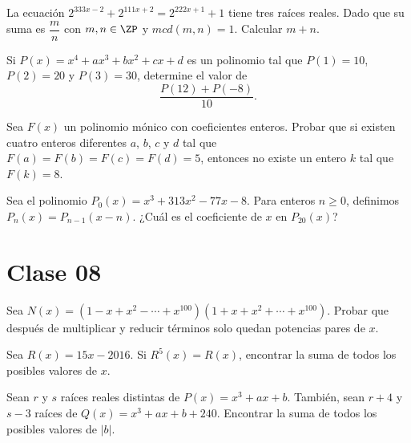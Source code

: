     \begin{section-problem}
        La ecuación $2^{333x - 2} + 2^{111x + 2} = 2^{222x + 1} + 1$ tiene tres raíces reales.
        Dado que su suma es $\dfrac{m}{n}$ con $m, n \in \ZP$ y $mcd(m, n) = 1$.
        Calcular $m + n$.
    \end{section-problem}

    \begin{section-problem}
        Si $P(x) = x^4 + ax^3 + bx^2 + cx + d$ es un polinomio tal que $P(1) = 10$, $P(2) = 20$ y $P(3) = 30$, determine el valor de
        \[\frac{P(12) + P(-8)}{10}.\]
    \end{section-problem}

    \begin{section-problem}
        Sea $F(x)$ un polinomio mónico con coeficientes enteros.
        Probar que si existen cuatro enteros diferentes $a$, $b$, $c$ y $d$ tal que $F(a) = F(b) = F(c)  = F(d) = 5$,
        entonces no existe un entero $k$ tal que $F(k) = 8$.
    \end{section-problem}

    \begin{section-problem}
        Sea el polinomio $P_0(x) = x^3 + 313x^2 - 77x - 8$.
        Para enteros $n \geq 0$, definimos $P_n(x) = P_{n - 1}(x - n)$.
        ¿Cuál es el coeficiente de $x$ en $P_{20}(x)$?
    \end{section-problem}



\section{Clase 08}

\begin{section-problem}
    Sea $N(x) = (1 - x + x^2 - \cdots + x^{100})(1 + x + x^2 + \cdots + x^{100})$.
    Probar que después de multiplicar y reducir términos solo quedan potencias pares de $x$.
\end{section-problem}

\begin{section-problem}
    Sea $R(x) = 15x - 2016$.
    Si $R^5(x) = R(x)$, encontrar la suma de todos los posibles valores de $x$.
\end{section-problem}

\begin{section-problem}
    Sean $r$ y $s$ raíces reales distintas de $P(x) = x^3 + ax + b$.
    También, sean $r + 4$ y $s - 3$ raíces de $Q(x) = x^3 + ax + b + 240$.
    Encontrar la suma de todos los posibles valores de $|b|$.
\end{section-problem}

